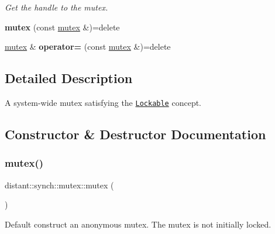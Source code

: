 \begin{DoxyCompactItemize}
\begin{DoxyCompactList}\small\item\em Get the handle to the mutex. \end{DoxyCompactList}\item 
\mbox{\label{classdistant_1_1synch_1_1mutex_adf5066835ff2753520bb4ead031c6a61}} 
{\bfseries mutex} (const \mbox{\hyperlink{classdistant_1_1synch_1_1mutex}{mutex}} \&)=delete
\item 
\mbox{\label{classdistant_1_1synch_1_1mutex_a77692917eff76ae0cc43d803b75266b7}} 
\mbox{\hyperlink{classdistant_1_1synch_1_1mutex}{mutex}} \& {\bfseries operator=} (const \mbox{\hyperlink{classdistant_1_1synch_1_1mutex}{mutex}} \&)=delete
\end{DoxyCompactItemize}


\subsection{Detailed Description}
A system-\/wide mutex satisfying the \href{http://en.cppreference.com/w/cpp/concept/Lockable}{\tt Lockable} concept. 

\subsection{Constructor \& Destructor Documentation}
\mbox{\label{classdistant_1_1synch_1_1mutex_aea8a33da8746aae1d78ebb970d80bc1a}} 
\subsubsection{\texorpdfstring{mutex()}{mutex()}\hspace{0.1cm}{\footnotesize\ttfamily [1/2]}}
{\footnotesize\ttfamily distant\+::synch\+::mutex\+::mutex (\begin{DoxyParamCaption}{ }\end{DoxyParamCaption})\hspace{0.3cm}{\ttfamily [inline]}}



Default construct an anonymous mutex. The mutex is not initially locked. 


